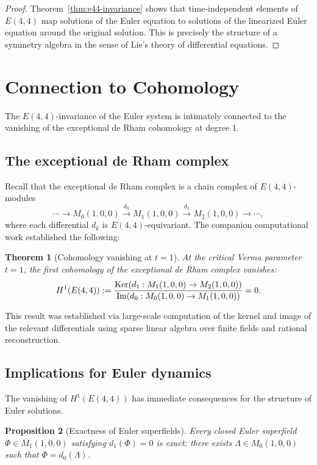 \documentclass[reqno,10pt]{amsart}
\theoremstyle{plain}
\newtheorem{theorem}{Theorem}[section]
\newtheorem{proposition}[theorem]{Proposition}
\theoremstyle{definition}
\def\Ker{{\rm Ker}}
\def\gE{E(4,4)}
\begin{document}
\begin{proof}
Theorem~\ref{thm:e44-invariance} shows that time-independent elements of $\gE$ map solutions of the Euler equation to solutions of the linearized Euler equation around the original solution. This is precisely the structure of a symmetry algebra in the sense of Lie's theory of differential equations.
\end{proof}

\section{Connection to Cohomology}

The $\gE$-invariance of the Euler system is intimately connected to the vanishing of the exceptional de Rham cohomology at degree 1.

\subsection{The exceptional de Rham complex}

Recall that the exceptional de Rham complex is a chain complex of $\gE$-modules
\[
  \cdots \to M_0(1,0,0) \xrightarrow{d_0} M_1(1,0,0) \xrightarrow{d_1} M_2(1,0,0) \to \cdots,
\]
where each differential $d_k$ is $\gE$-equivariant. The companion computational work established the following:

\begin{theorem}[Cohomology vanishing at $t=1$]\label{thm:cohomology-vanishing}
At the critical Verma parameter $t=1$, the first cohomology of the exceptional de Rham complex vanishes:
\[
  H^1(\gE) := \frac{\Ker(d_1: M_1(1,0,0)\to M_2(1,0,0))}{\text{Im}(d_0: M_0(1,0,0)\to M_1(1,0,0))} = 0.
\]
\end{theorem}

This result was established via large-scale computation of the kernel and image of the relevant differentials using sparse linear algebra over finite fields and rational reconstruction.

\subsection{Implications for Euler dynamics}

The vanishing of $H^1(\gE)$ has immediate consequences for the structure of Euler solutions.

\begin{proposition}[Exactness of Euler superfields]
Every closed Euler superfield $\Phi\in M_1(1,0,0)$ satisfying $d_1(\Phi)=0$ is exact: there exists $\Lambda\in M_0(1,0,0)$ such that $\Phi = d_0(\Lambda)$.
\end{proposition}
\end{document}
